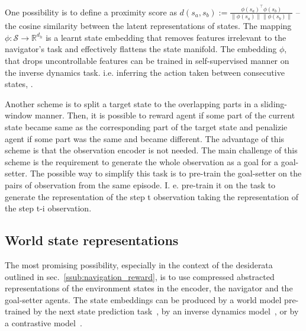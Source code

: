 \documentclass[acmsmall, nonacm]{acmart}
\begin{document}

One possibility is to define a proximity score as $
    d(s_a, s_b) 
        := \frac{\phi(s_a)^\top \phi(s_b)}{\|\phi(s_a)\|\|\phi(s_b)\|}
$ -- the cosine similarity between the latent representations of states. The mapping $
    \phi \colon \mathcal{S} \to \mathbb{R}^{d_h}
$ is a learnt state embedding that removes features irrelevant to the navigator's task and effectively flattens the state manifold. The embedding $\phi$, that drops uncontrollable features can be trained in self-supervised manner on the inverse dynamics task. i.e. inferring the action taken between consecutive states, \citep{choi_contingency-aware_2019,badia_never_2020}.


Another scheme is to split a target state to the overlapping parts in a sliding-window manner. Then, it is possible to reward agent if some part of the current state became same as the corresponding part of the target state and penalizie agent if some part was the same and became different. The advantage of this scheme is that the observation encoder is not needed. The main challenge of this scheme is the requirement to generate the whole observation as a goal for a goal-setter. The possible way to simplify this task is to pre-train the goal-setter on the pairs of observation from the same episode. I. e. pre-train it on the task to generate the representation of the step t observation taking the representation of the step t-i observation.

\subsection{World state representations}
\label{sec:world-state-repr}

The most promising possibility, especially in the context of the desiderata outlined in sec.~\ref{ssub:navigation_reward}, is to use compressed abstracted representations of the environment states in the encoder, the navigator and the goal-setter agents. The state embeddings can be produced by a world model pre-trained by the next state prediction task~\citep{ha_recurrent_2018}, by an inverse dynamics model~\citep{badia_never_2020}, or by a contrastive model~\citep{Ugadiarov2021LongTermEI}.
\end{document}
